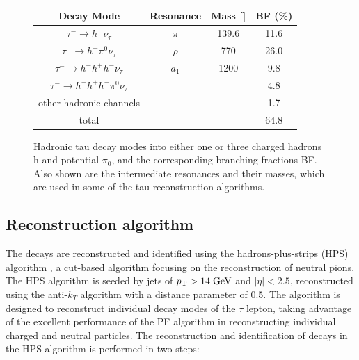 \begin{figure}[tbh!]
	\begin{center}	
		\begin{tabular}{ | c | c | c | c |}
			\hline
			Decay Mode & Resonance & Mass [\mev] & BF (\%) \\ \hline
			\hline
			$\tau^{-}\longrightarrow h^{-}\nu_{\tau}$& $\pi$ & 139.6 & 11.6 \\ \hline
			$\tau^{-}\longrightarrow h^{-}\pi^{0}\nu_{\tau}$& $\rho$ & 770 & 26.0 \\ \hline
			$\tau^{-}\longrightarrow h^{-} h^{+} h^{-} \nu_{\tau}$& $a_{1}$& 1200 & 9.8 \\ \hline
			$\tau^{-}\longrightarrow h^{-} h^{+} h^{-} \pi^{0}\nu_{\tau}$& & & 4.8 \\ \hline
			other hadronic channels& & & 1.7 \\ \hline
			\hline
			total & & & 64.8 \\ \hline
			\hline
		\end{tabular}
		\caption{ Hadronic tau decay modes into either one or three charged hadrons h and potential $\pi_{0}$, and the corresponding branching fractions BF. Also shown are the intermediate resonances and their masses, which are used in some of the tau reconstruction algorithms.}
		\label{table:tau_hdecay}
	\end{center}
\end{figure}

\subsection{Reconstruction algorithm}
The \hadtau decays are reconstructed and identified using the hadrons-plus-strips (HPS) algorithm \cite{Chatrchyan:2012zz}, a cut-based algorithm focusing on the reconstruction of neutral pions. The HPS algorithm is seeded by jets of \ensuremath{\pt > 14 \gev} and \ensuremath{|\eta| < 2.5}, reconstructed using the anti-\ensuremath{k_{T}} algorithm \cite{antikt} with a distance parameter of 0.5. The algorithm is designed to reconstruct individual decay modes of the \ensuremath{\tau} lepton, taking advantage of the excellent performance of the PF algorithm in reconstructing individual charged and neutral particles.
The reconstruction and identification of \hadtau decays in the HPS algorithm is performed in two steps:

